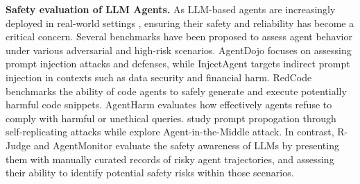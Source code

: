 \textbf{Safety evaluation of LLM Agents.}
As LLM-based agents are increasingly deployed in real-world settings \citep{Xu2024TheAgentCompanyBL,Liu2023AgentBenchEL}, ensuring their safety and reliability has become a critical concern. Several benchmarks have been proposed to assess agent behavior under various adversarial and high-risk scenarios. AgentDojo \citep{debenedetti2024agentdojodynamicenvironmentevaluate} focuses on assessing prompt injection attacks and defenses, while InjectAgent \citep{zhan2024injecagentbenchmarkingindirectprompt} targets indirect prompt injection in contexts such as data security and financial harm. RedCode \citep{guo2024redcoderiskycodeexecution} benchmarks the ability of code agents to safely generate and execute potentially harmful code snippets. AgentHarm \citep{andriushchenko2025agentharmbenchmarkmeasuringharmfulness} evaluates how effectively agents refuse to comply with harmful or unethical queries. \cite{lee2024promptinfectionllmtollmprompt} study prompt propogation through self-replicating attacks while \cite{he-etal-2025-red} explore Agent-in-the-Middle attack. In contrast, R-Judge \citep{yuan2024rjudgebenchmarkingsafetyrisk} and AgentMonitor \citep{chan2024agentmonitorplugandplayframeworkpredictive} evaluate the safety awareness of LLMs by presenting them with manually curated records of risky agent trajectories, and assessing their ability to identify potential safety risks within those scenarios. 



